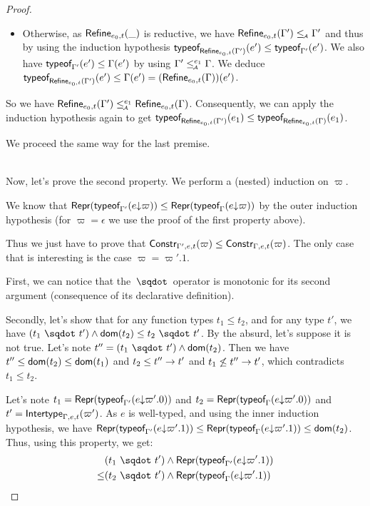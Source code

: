 \documentclass[a4paper]{article}
\theoremstyle{definition}
\begin{document}
\begin{proof}
\begin{description}
\begin{itemize}
      \item Otherwise, as $\Refine {e_0,t} {\_}$ is reductive,
      we have $\Refine {e_0,t} {\Gamma'} \leqA \Gamma'$ and thus by using the induction hypothesis
      $\tyof {e'} {\Refine {e_0,t} {\Gamma'}} \leq \tyof {e'} {\Gamma'}$.
      We also have $\tyof {e'} {\Gamma'} \leq \Gamma(e')$ by using $\Gamma' \leqA^{e_1} \Gamma$.
      We deduce $\tyof {e'} {\Refine {e_0,t} {\Gamma'}} \leq \Gamma(e') = (\Refine {e_0,t} \Gamma) (e')$.
    \end{itemize}
    
    So we have $\Refine {e_0,t} {\Gamma'} \leqA^{e_1} \Refine {e_0,t} \Gamma$.
    Consequently, we can apply the induction hypothesis again to get
    $\tyof {e_1} {\Refine {e_0,t} {\Gamma'}} \leq \tyof {e_1} {\Refine {e_0,t} {\Gamma}}$.

    We proceed the same way for the last premise.
  \end{description}\ \\

  Now, let's prove the second property.
  We perform a (nested) induction on $\varpi$.

  We know that $\tsrep{\tyof {\occ e \varpi} {\Gamma'}} \leq \tsrep{\tyof {\occ e \varpi} {\Gamma}}$
  by the outer induction hypothesis (for $\varpi=\epsilon$ we use the proof of the first property above).

  Thus we just have to prove that $\constr {\varpi} {\Gamma',e,t} \leq \constr {\varpi} {\Gamma,e,t}$.
  The only case that is interesting is the case $\varpi=\varpi'.1$.

  First, we can notice that the $\worra {} {}$ operator is monotonic for its second argument
  (consequence of its declarative definition).

  Secondly, let's show that for any function types $t_1 \leq t_2$, and for any type $t'$,
  we have $(\worra {t_1} {t'}) \land \dom {t_2} \leq \worra {t_2} {t'}$. By the absurd, let's suppose it is not true.
  Let's note $t'' = (\worra {t_1} {t'}) \land \dom {t_2}$.
  Then we have $t'' \leq \dom {t_2} \leq \dom {t_1}$ and $t_2 \leq \arrow {t''} {t'}$ and
  $t_1 \not\leq \arrow {t''} {t'}$, which contradicts $t_1 \leq t_2$.

  Let's note $t_1 = \tsrep {\tyof{\occ e{\varpi'.0}}{\Gamma'}}$ and $t_2 = \tsrep {\tyof{\occ e{\varpi'.0}}\Gamma}$
  and $t'=\env {\Gamma,e,t} (\varpi')$.
  As $e$ is well-typed, and using the inner induction hypothesis, we have $\tsrep {\tyof {\occ e {\varpi'.1}} {\Gamma'}} \leq \tsrep {\tyof {\occ e {\varpi'.1}} {\Gamma}} \leq \dom {t_2}$.\\
  Thus, using this property, we get:\\
  \begin{align*}
  &(\worra {t_1} {t'}) \land \tsrep {\tyof {\occ e {\varpi'.1}} {\Gamma'}}\\
  \leq &(\worra {t_2} {t'}) \land \tsrep {\tyof {\occ e {\varpi'.1}} {\Gamma}}
  \end{align*}


\end{proof}
\end{document}

